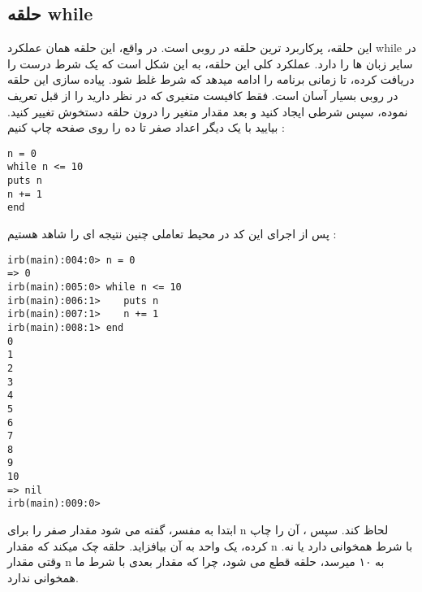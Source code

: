 \documentclass[11pt]{article}
\begin{document}
\subsection{حلقه while}
این حلقه، پرکاربرد ترین حلقه در روبی است. در واقع، این حلقه همان عملکرد while در سایر زبان ها را دارد. عملکرد کلی این حلقه، به این شکل است که یک شرط درست را دریافت کرده، تا زمانی برنامه را ادامه میدهد که شرط غلط شود. پیاده سازی این حلقه در روبی بسیار آسان است. فقط کافیست متغیری که در نظر دارید را از قبل تعریف نموده، سپس شرطی ایجاد کنید و بعد مقدار متغیر را درون حلقه دستخوش تغییر کنید. بیایید با یک دیگر اعداد صفر تا ده را روی صفحه چاپ کنیم :
\begin{latin}
\begin{verbatim}
n = 0
while n <= 10
puts n
n += 1
end
\end{verbatim}
\end{latin}
پس از اجرای این کد در محیط تعاملی چنین نتیجه ای را شاهد هستیم :
\begin{latin}
\begin{verbatim}
irb(main):004:0> n = 0
=> 0
irb(main):005:0> while n <= 10
irb(main):006:1>    puts n
irb(main):007:1>    n += 1
irb(main):008:1> end
0
1
2
3
4
5
6
7
8
9
10
=> nil
irb(main):009:0> 
\end{verbatim}
\end{latin}
ابتدا به مفسر، گفته می شود مقدار صفر را برای n لحاظ کند. سپس ، آن را چاپ کرده، یک واحد به آن بیافزاید. حلقه چک میکند که مقدار n با شرط همخوانی دارد یا نه. وقتی مقدار n به ۱۰ میرسد، حلقه قطع می شود، چرا که مقدار بعدی با شرط ما همخوانی ندارد. 
\end{document}
